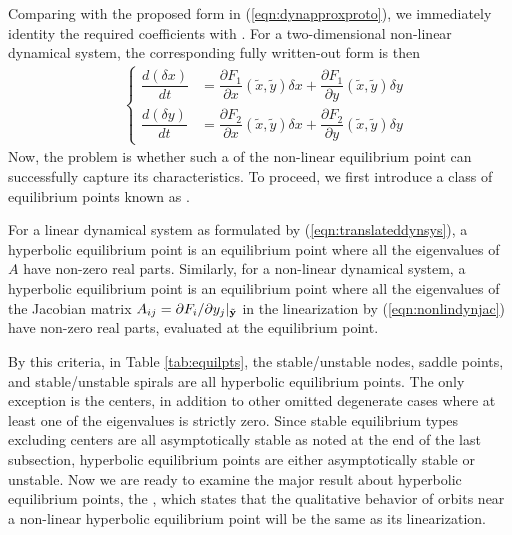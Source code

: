 Comparing with the proposed form in (\ref{eqn:dynapproxproto}), we immediately identity the required coefficients  with . For a two-dimensional non-linear dynamical system, the corresponding fully written-out form is then
\begin{align}
&\left\{\begin{alignedat}{1}
\dfrac{d(\delta x)}{dt} &= \dfrac{\partial F_1}{\partial x}(\tilde{x}, \tilde{y}) \delta x + \dfrac{\partial F_1}{\partial y}(\tilde{x}, \tilde{y}) \delta y \\
\dfrac{d(\delta y)}{dt} &= \dfrac{\partial F_2}{\partial x}(\tilde{x}, \tilde{y}) \delta x + \dfrac{\partial F_2}{\partial y}(\tilde{x}, \tilde{y}) \delta y
\end{alignedat}\right.
\end{align}
Now, the problem is whether such a  of the non-linear equilibrium point can successfully capture its characteristics. To proceed, we first introduce a class of equilibrium points known as .
\begin{defn}
For a linear dynamical system as formulated by (\ref{eqn:translateddynsys}), 
a hyperbolic equilibrium point is an equilibrium point where all the eigenvalues of $A$ have non-zero real parts. Similarly, for a non-linear dynamical system, a hyperbolic equilibrium point is an equilibrium point where all the eigenvalues of the Jacobian matrix $A_{ij} = \smash{\partial F_i/\partial y_j|_{\tilde{\textbf{y}}}}$ in the linearization by (\ref{eqn:nonlindynjac}) have non-zero real parts, evaluated at the equilibrium point.
\end{defn}
By this criteria, in Table \ref{tab:equilpts}, the stable/unstable nodes, saddle points, and stable/unstable spirals are all hyperbolic equilibrium points. The only exception is the centers, in addition to other omitted degenerate cases where at least one of the eigenvalues is strictly zero. Since stable equilibrium types excluding centers are all asymptotically stable as noted at the end of the last subsection, hyperbolic equilibrium points are either asymptotically stable or unstable. Now we are ready to examine the major result about hyperbolic equilibrium points, the , which states that the qualitative behavior of orbits near a non-linear hyperbolic equilibrium point will be the same as its linearization.
